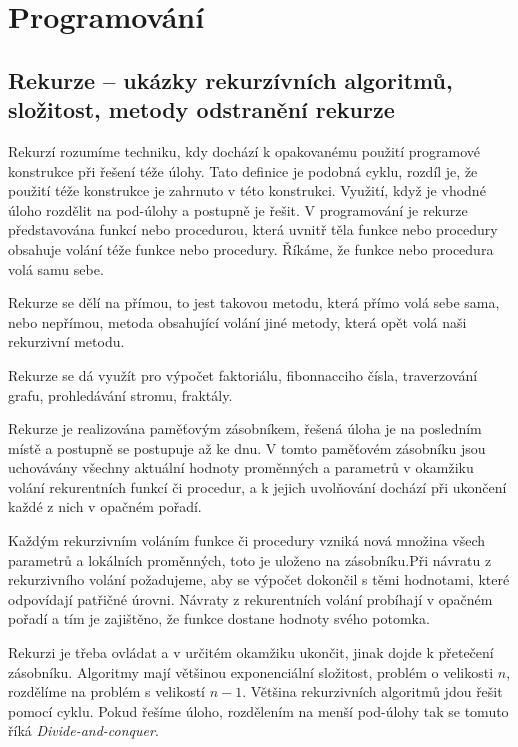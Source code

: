 \section{Programování}
\subsection{Rekurze – ukázky rekurzívních algoritmů, složitost, metody odstranění rekurze}
Rekurzí rozumíme techniku, kdy dochází k opakovanému použití programové konstrukce při řešení téže úlohy. 
Tato definice je podobná cyklu, rozdíl je, že použití téže konstrukce je zahrnuto v této konstrukci. Využití, když je vhodné úloho rozdělit na pod-úlohy a postupně je řešit. V programování je rekurze představována funkcí nebo procedurou, která uvnitř těla funkce nebo procedury obsahuje volání téže funkce nebo procedury.  Říkáme, že funkce nebo procedura volá samu sebe.

Rekurze se dělí na přímou, to jest takovou metodu, která přímo volá sebe sama, nebo nepřímou, metoda obsahující volání jiné metody, která opět volá naši rekurzivní metodu. 

Rekurze se dá využít pro výpočet faktoriálu, fibonnacciho čísla, traverzování grafu, prohledávání stromu, fraktály.

Rekurze je realizována paměťovým zásobníkem, řešená úloha je na posledním místě a postupně se postupuje až ke dnu. V tomto paměťovém zásobníku jsou uchovávány všechny aktuální hodnoty proměnných a parametrů v okamžiku volání rekurentních funkcí či procedur, a k jejich uvolňování dochází při ukončení každé z nich v opačném pořadí.

Každým rekurzivním voláním funkce či procedury vzniká nová množina všech parametrů a lokálních proměnných, toto je uloženo na zásobníku.Při návratu z rekurzivního volání požadujeme, aby se výpočet dokončil s těmi hodnotami, které odpovídají patřičné úrovni. Návraty z rekurentních volání probíhají v opačném pořadí a tím je zajištěno, že funkce dostane hodnoty svého potomka. 

Rekurzi je třeba ovládat a v určitém okamžiku ukončit, jinak dojde k přetečení zásobníku. Algoritmy mají většinou exponenciální složitost, problém o velikosti $n$, rozdělíme na problém s velikostí $n-1$. Většina rekurzivních algoritmů jdou řešit pomocí cyklu. Pokud řešíme úloho, rozdělením na menší pod-úlohy tak se tomuto říká \textit{Divide-and-conquer}.

